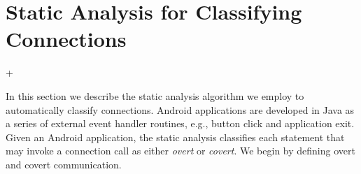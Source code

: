 \section{Static Analysis for Classifying Connections}
\label{sec:analysis}

\lstMakeShortInline[basicstyle=\scriptsize\ttfamily,keywordstyle=\color{DarkPurple},breaklines=false]+

In this section we describe the static analysis algorithm we employ to
automatically classify connections.  Android applications are
developed in Java as a series of external event handler routines,
e.g., button click and application exit.  Given an Android
application, the static analysis classifies each statement that may
invoke a connection call as either {\it overt} or {\it covert}.  We
begin by defining overt and covert communication.




